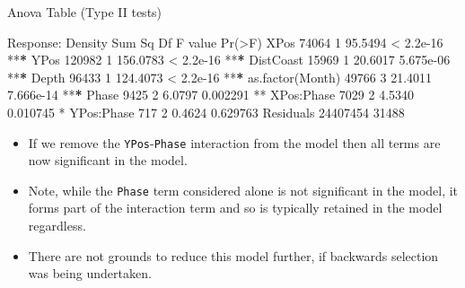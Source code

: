 \documentclass[
  oneside]{krantz}
\newenvironment{Shaded}{\begin{snugshade}}{\end{snugshade}}
\newcommand{\DecValTok}[1]{\textcolor[rgb]{0.00,0.00,0.81}{#1}}
\newcommand{\ErrorTok}[1]{\textcolor[rgb]{0.64,0.00,0.00}{\textbf{#1}}}
\newcommand{\FloatTok}[1]{\textcolor[rgb]{0.00,0.00,0.81}{#1}}
\newcommand{\FunctionTok}[1]{\textcolor[rgb]{0.00,0.00,0.00}{#1}}
\newcommand{\NormalTok}[1]{#1}
\newcommand{\SpecialCharTok}[1]{\textcolor[rgb]{0.00,0.00,0.00}{#1}}
\providecommand{\tightlist}{%
  \setlength{\itemsep}{0pt}\setlength{\parskip}{0pt}}
\begin{document}
\begin{Shaded}
\begin{Highlighting}[]
\NormalTok{Anova }\FunctionTok{Table}\NormalTok{ (Type II tests)}

\NormalTok{Response}\SpecialCharTok{:}\NormalTok{ Density}
\NormalTok{                   Sum Sq    Df  F value    }\FunctionTok{Pr}\NormalTok{(}\SpecialCharTok{\textgreater{}}\NormalTok{F)    }
\NormalTok{XPos                }\DecValTok{74064}     \DecValTok{1}  \FloatTok{95.5494} \SpecialCharTok{\textless{}} \FloatTok{2.2e{-}16} \SpecialCharTok{**}\ErrorTok{*}
\NormalTok{YPos               }\DecValTok{120982}     \DecValTok{1} \FloatTok{156.0783} \SpecialCharTok{\textless{}} \FloatTok{2.2e{-}16} \SpecialCharTok{**}\ErrorTok{*}
\NormalTok{DistCoast           }\DecValTok{15969}     \DecValTok{1}  \FloatTok{20.6017} \FloatTok{5.675e{-}06} \SpecialCharTok{**}\ErrorTok{*}
\NormalTok{Depth               }\DecValTok{96433}     \DecValTok{1} \FloatTok{124.4073} \SpecialCharTok{\textless{}} \FloatTok{2.2e{-}16} \SpecialCharTok{**}\ErrorTok{*}
\FunctionTok{as.factor}\NormalTok{(Month)    }\DecValTok{49766}     \DecValTok{3}  \FloatTok{21.4011} \FloatTok{7.666e{-}14} \SpecialCharTok{**}\ErrorTok{*}
\NormalTok{Phase                }\DecValTok{9425}     \DecValTok{2}   \FloatTok{6.0797}  \FloatTok{0.002291} \SpecialCharTok{**} 
\NormalTok{XPos}\SpecialCharTok{:}\NormalTok{Phase           }\DecValTok{7029}     \DecValTok{2}   \FloatTok{4.5340}  \FloatTok{0.010745} \SpecialCharTok{*}  
\NormalTok{YPos}\SpecialCharTok{:}\NormalTok{Phase            }\DecValTok{717}     \DecValTok{2}   \FloatTok{0.4624}  \FloatTok{0.629763}    
\NormalTok{Residuals        }\DecValTok{24407454} \DecValTok{31488}                       
\end{Highlighting}
\end{Shaded}

\begin{itemize}
\tightlist
\item
  If we remove the \texttt{YPos}-\texttt{Phase} interaction from the model then all terms are now significant in the model.
\item
  Note, while the \texttt{Phase} term considered alone is not significant in the model, it forms part of the interaction term and so is typically retained in the model regardless.
\item
  There are not grounds to reduce this model further, if backwards selection was being undertaken.
\end{itemize}
\end{document}
